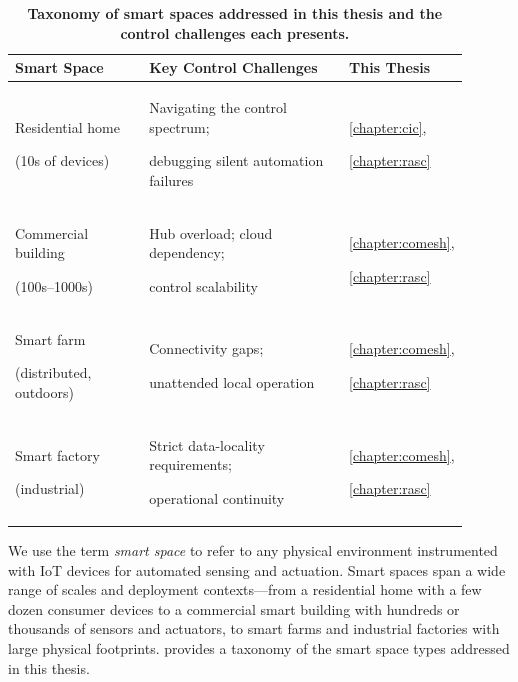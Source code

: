 \begin{table}[th!]
    \centering
    \caption{\bf \small Taxonomy of smart spaces addressed in this thesis and the control challenges each presents.}
    \bigskip
    \label{intro:tab:taxonomy}
    \begin{tabularx}{\linewidth}{p{0.3\linewidth}p{0.45\linewidth}p{0.15\linewidth}}
        \toprule
        \textbf{Smart Space} & \textbf{Key Control Challenges} & \textbf{This Thesis} \\
        \midrule
        Residential home \par (10s of devices)   & Navigating the control spectrum; \par debugging silent automation failures & \ref{chapter:cic}, \par \ref{chapter:rasc} \\[2pt]
        \midrule
        Commercial building \par (100s--1000s)   & Hub overload; cloud dependency; \par control scalability                   & \ref{chapter:comesh}, \par \ref{chapter:rasc} \\[2pt]
        \midrule
        Smart farm \par (distributed, outdoors)  & Connectivity gaps; \par unattended local operation                         & \ref{chapter:comesh}, \par \ref{chapter:rasc} \\[2pt]
        \midrule
        Smart factory \par (industrial)          & Strict data-locality requirements; \par operational continuity             & \ref{chapter:comesh}, \par \ref{chapter:rasc} \\
        \bottomrule
    \end{tabularx}
\end{table}

We use the term \emph{smart space} to refer to any physical environment instrumented with IoT devices for automated sensing and actuation. Smart spaces span a wide range of scales and deployment contexts---from a residential home with a few dozen consumer devices to a commercial smart building with hundreds or thousands of sensors and actuators, to smart farms and industrial factories with large physical footprints.  provides a taxonomy of the smart space types addressed in this thesis.

